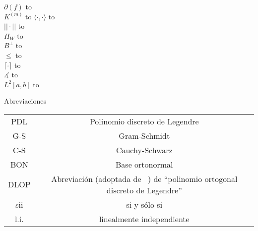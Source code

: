  $\partial(f)$ \hbox to\linewidth{\hfil Grado de un polinomio $f$ \hfil}   \\
 $K^{(m)}$ \hbox to  
 $\langle \cdot, \cdot \rangle$ \hbox to\linewidth{\hfil Producto punto \hfil}  \\
 $|| \cdot ||$ \hbox to\linewidth{\hfil Norma \hfil} \\
 $\Pi_{W}$ \hbox to\linewidth{\hfil Proyección sobre el subespacio cerrado $W$ \hfil}  \\
 $B^{\perp}$ \hbox to\linewidth{\hfil Complemento ortogonal de un subconjunto $B$ de un espacio con producto punto. \hfil}  \\
 $\leq$ \hbox to\linewidth{\hfil Relación ``ser subespacio de'' \hfil}   \\
 $\lceil \cdot \rceil$ \hbox to\linewidth{\hfil Función techo \hfil}  \\
 $\measuredangle$ \hbox to\linewidth{\hfil Ángulo \hfil}  \\
 $L^{2}[a,b]$ \hbox to \\



\vspace{0.5cm}

\begin{center}
\huge{Abreviaciones}
\end{center}

\vspace{0.5cm}

\begin{tabular}{ c c }
 PDL & Polinomio discreto de Legendre \\
 G-S & Gram-Schmidt \\
 C-S & Cauchy-Schwarz \\
 BON & Base ortonormal \\
 DLOP & Abreviación (adoptada de ~\cite{Neuman})
 de ``polinomio ortogonal discreto de Legendre'' \\
 sii & si y sólo si \\
 l.i. & linealmente independiente
\end{tabular}




\newpage
